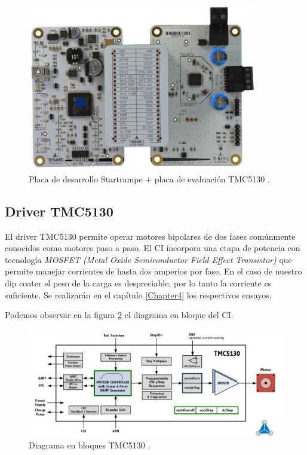 \begin{figure}[htpb]
\centering 
\includegraphics[width=0.9\textwidth]{./Figures/tmc5130_placa.jpg}
\caption{Placa de desarrollo Startrampe + placa de evaluación TMC5130 \protect\footnotemark.}
\label{fig:tmc5130_placa}
\end{figure}



  
\subsection{Driver TMC5130}

El driver TMC5130 permite operar motores bipolares de dos fases comúnmente conocidos como motores paso a paso. El CI incorpora una etapa de potencia con tecnología \textit{MOSFET (Metal Oxide Semiconductor Field Effect Transistor)}  que permite manejar corrientes de hasta dos amperios por fase. En el caso de nuestro dip coater el peso de la carga es despreciable, por lo tanto la corriente es suficiente. Se realizarán en el capítulo \ref{Chapter4} los respectivos ensayos.

Podemos observar en la figura \ref{fig:tmc5130_diagrama} el diagrama en bloque del CI.

\begin{figure}[htpb]
\centering 
\includegraphics[width=1.1\textwidth]{./Figures/tmc5130_diagrama.png}
\caption{Diagrama en bloques TMC5130 \protect\footnotemark.}
\label{fig:tmc5130_diagrama}
\end{figure}

